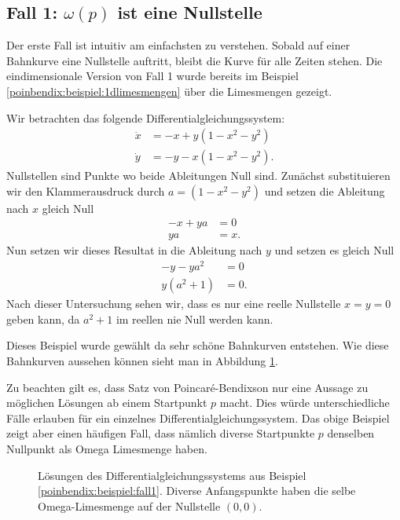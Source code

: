 \subsection{Fall 1: $\omega(p)$ ist eine Nullstelle} \label{poinbendix:subsection:fall1}

Der erste Fall ist intuitiv am einfachsten zu verstehen.
Sobald auf einer Bahnkurve eine Nullstelle auftritt, bleibt die Kurve für alle Zeiten stehen.
Die eindimensionale Version von Fall 1  wurde bereits im Beispiel \ref{poinbendix:beispiel:1dlimesmengen} über die Limesmengen gezeigt.

\begin{beispiel} \label{poinbendix:beispiel:fall1}
Wir betrachten das folgende Differentialgleichungssystem:
\begin{align*}
    \dot{x} &= -x + y(1-x^2-y^2) \\
    \dot{y} &= -y - x(1-x^2-y^2).
\end{align*}
Nullstellen sind Punkte wo beide Ableitungen Null sind.
Zunächst substituieren wir den Klammerausdruck durch $a = (1-x^2-y^2)$ und setzen die Ableitung nach $x$ gleich Null
\begin{align*}
    -x + ya &= 0 \\
    ya &= x.
\end{align*}
Nun setzen wir dieses Resultat in die Ableitung nach $y$ und setzen es gleich Null
\begin{align*}
    -y - ya^2 &= 0 \\
    y(a^2+1) &= 0.
\end{align*}
Nach dieser Untersuchung sehen wir, dass es nur eine reelle Nullstelle $x=y=0$ geben kann, da $a^2 + 1$ im reellen nie Null werden kann.

Dieses Beispiel wurde gewählt da sehr schöne Bahnkurven entstehen.
Wie diese Bahnkurven aussehen können sieht man in Abbildung \ref{poinbendix:fig:fixed_point_omega_set}.
\end{beispiel}

Zu beachten gilt es, dass Satz von Poincaré-Bendixson nur eine Aussage zu möglichen Lösungen ab einem Startpunkt $p$ macht.
Dies würde unterschiedliche Fälle erlauben für ein einzelnes Differentialgleichungssystem.
Das obige Beispiel zeigt aber einen häufigen Fall, dass nämlich diverse Startpunkte $p$ denselben Nullpunkt als Omega Limesmenge haben.

\begin{figure}
    \centering
    
    \caption{Lösungen des Differentialgleichungssystems aus Beispiel \ref{poinbendix:beispiel:fall1}.
    Diverse Anfangspunkte haben die selbe Omega-Limesmenge auf der Nullstelle $(0,0)$.}
    \label{poinbendix:fig:fixed_point_omega_set}
\end{figure}

